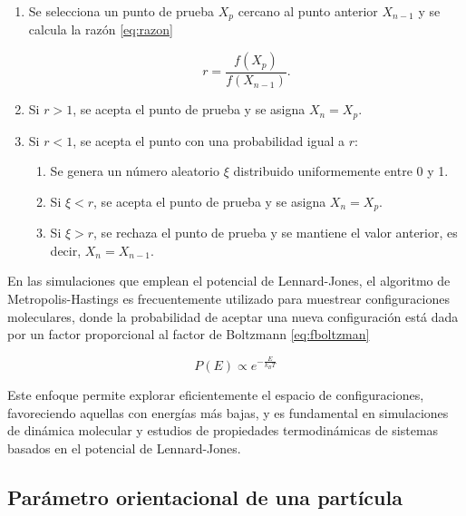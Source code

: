 \begin{enumerate}
	


\item  Se selecciona un punto de prueba \(X_{p}\) cercano al punto anterior \(X_{n-1}\) y se calcula la razón \ref{eq:razon}

\begin{equation} \label{eq:razon}
	r = \frac{f(X_{p})}{f(X_{n-1})}.
\end{equation} 



\item Si $r > 1$, se acepta el punto de prueba y se asigna $X_{n} = X_{p}$.

\item Si $r < 1$, se acepta el punto con una probabilidad igual a $r$:

	\begin{enumerate}

		\item Se genera un número aleatorio \(\xi\) distribuido uniformemente entre 0 y 1.
		
		\item Si \(\xi < r\), se acepta el punto de prueba y se asigna \(X_{n} = X_{p}\).
		
		\item Si \(\xi > r\), se rechaza el punto de prueba y se mantiene el valor anterior, es decir, \(X_{n} = X_{n-1}\).

	\end{enumerate}
\end{enumerate}

En las simulaciones que emplean el potencial de Lennard-Jones, el algoritmo de Metropolis-Hastings es frecuentemente utilizado para muestrear configuraciones moleculares, donde la probabilidad de aceptar una nueva configuración está dada por un factor proporcional al factor de Boltzmann \ref{eq:fboltzman}

\begin{equation} \label{eq:fboltzman}
	P(E) \propto e^{-\frac{E}{k_{B}T}}
\end{equation}

Este enfoque permite explorar eficientemente el espacio de configuraciones, favoreciendo aquellas con energías más bajas, y es fundamental en simulaciones de dinámica molecular y estudios de propiedades termodinámicas de sistemas basados en el potencial de Lennard-Jones.


\subsection{Parámetro orientacional de una partícula}

